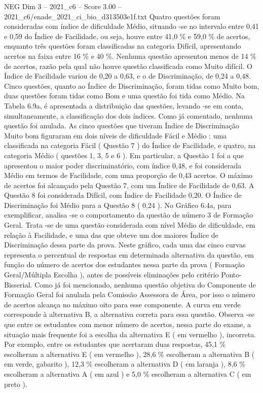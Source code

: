 \begin{textsample}{NEG Dim 3 – 2021\_c6 – Score 3.00 – 2021\_c6/enade\_2021\_ci\_bio\_d313503e1f.txt}
Quatro questões foram consideradas com índice de dificuldade Médio, situando -se no intervalo entre 0,41 e 0,59 do Índice de Facilidade, ou seja, houve entre 41,0 \% e 59,0 \% de acertos, enquanto três questões foram classificadas na categoria Difícil, apresentando acertos na faixa entre 16 \% e 40 \%.
Nenhuma questão apresentou menos de 14 \% de acertos, razão pela qual não houve questão classificada como Muito difícil.
O Índice de Facilidade variou de 0,20 a 0,63, e o de Discriminação, de 0,24 a 0,48.
Cinco questões, quanto ao Índice de Discriminação, foram tidas como Muito bom, duas questões foram tidas como Bom e uma questão foi tida como Médio.
Na Tabela 6.9a, é apresentada a distribuição das questões, levando -se em conta, simultaneamente, a classificação dos dois índices.
Como já comentado, nenhuma questão foi anulada.
As cinco questões que tiveram Índice de Discriminação Muito bom figuraram em dois níveis de dificuldade Fácil e Médio : uma classificada na categoria Fácil ( Questão 7 ) do Índice de Facilidade, e quatro, na categoria Médio ( questões 1, 3, 5 e 6 ).
Em particular, a Questão 1 foi a que apresentou o maior poder discriminatório, com índice 0,48, e foi considerada Médio em termos de Facilidade, com uma proporção de 0,43 acertos.
O máximo de acertos foi alcançado pela Questão 7, com um Índice de Facilidade de 0,63.
A Questão 8 foi considerada Difícil, com Índice de Facilidade 0,20.
O Índice de Discriminação foi Médio para a Questão 8 ( 0,24 ).
No Gráfico 6.4a, para exemplificar, analisa -se o comportamento da questão de número 3 de Formação Geral.
Trata -se de uma questão considerada com nível Médio de dificuldade, em relação à Facilidade, e uma das que obteve um dos maiores Índice de Discriminação dessa parte da prova.
Neste gráfico, cada uma das cinco curvas representa o percentual de respostas em determinada alternativa da questão, em função do número de acertos dos estudantes nessa parte da prova ( Formação Geral/Múltipla Escolha ), antes de possíveis eliminações pelo critério Ponto-Bisserial.
Como já foi mencionado, nenhuma questão objetiva do Componente de Formação Geral foi anulada pela Comissão Assessora de Área, por isso o número de acertos alcança no máximo oito para esse componente.
A curva em verde corresponde à alternativa B, a alternativa correta para essa questão.
Observa -se que entre os estudantes com menor número de acertos, nessa parte do exame, a situação mais frequente foi a escolha da alternativa E ( em vermelho ), incorreta.
Por exemplo, entre os estudantes que acertaram duas respostas, 45,1 \% escolheram a alternativa E ( em vermelho ), 28,6 \% escolheram a alternativa B ( em verde, gabarito ), 12,3 \% escolheram a alternativa D ( em laranja ), 8,6 \% escolheram a alternativa A ( em azul ) e 5,0 \% escolheram a alternativa C ( em preto ).

\end{textsample}
